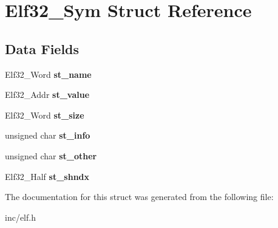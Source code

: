 \hypertarget{structElf32__Sym}{}\section{Elf32\+\_\+\+Sym Struct Reference}
\label{structElf32__Sym}
\subsection*{Data Fields}
\begin{DoxyCompactItemize}
\item 
Elf32\+\_\+\+Word {\bfseries st\+\_\+name}\hypertarget{structElf32__Sym_a6a972b30868879f8a1e071e0c45e5031}{}\label{structElf32__Sym_a6a972b30868879f8a1e071e0c45e5031}

\item 
Elf32\+\_\+\+Addr {\bfseries st\+\_\+value}\hypertarget{structElf32__Sym_abf8ff76884bc5e2acb5f7eb42f733c2e}{}\label{structElf32__Sym_abf8ff76884bc5e2acb5f7eb42f733c2e}

\item 
Elf32\+\_\+\+Word {\bfseries st\+\_\+size}\hypertarget{structElf32__Sym_a1b410e69fecd2610bc7e58d2b0245053}{}\label{structElf32__Sym_a1b410e69fecd2610bc7e58d2b0245053}

\item 
unsigned char {\bfseries st\+\_\+info}\hypertarget{structElf32__Sym_a7d131c44ec48708b1c98f9b00ca9d528}{}\label{structElf32__Sym_a7d131c44ec48708b1c98f9b00ca9d528}

\item 
unsigned char {\bfseries st\+\_\+other}\hypertarget{structElf32__Sym_a2e1bf6bedb5180f74ea8cbaf9cedfd36}{}\label{structElf32__Sym_a2e1bf6bedb5180f74ea8cbaf9cedfd36}

\item 
Elf32\+\_\+\+Half {\bfseries st\+\_\+shndx}\hypertarget{structElf32__Sym_a46e54847ab00fbea62df8ee5dff8dec6}{}\label{structElf32__Sym_a46e54847ab00fbea62df8ee5dff8dec6}

\end{DoxyCompactItemize}


The documentation for this struct was generated from the following file\+:\begin{DoxyCompactItemize}
\item 
inc/elf.\+h\end{DoxyCompactItemize}

